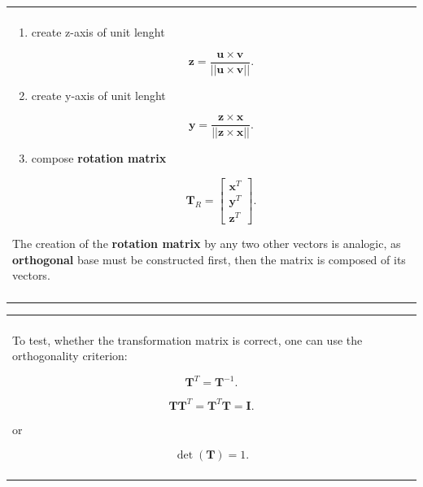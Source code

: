 \documentclass[10pt,b5paper,titlepage]{book}
\newenvironment{bbox}[1][0.96]
{
    \begin{center}
        \begin{tabular}{|p{#1\textwidth}|}
            \hline\\
}
{
            \\\\\hline
        \end{tabular}
    \end{center}
}
\begin{document}
\begin{enumerate}
\begin{bbox}
\begin{enumerate}
                \item create z-axis of unit lenght

                    \begin{equation}
                        \mathbf{z}
                        = \frac{\mathbf{u} \times \mathbf{v}}{||\mathbf{u} \times \mathbf{v}||}
                    .\end{equation}

                \item create y-axis of unit lenght

                    \begin{equation}
                        \mathbf{y}
                        = \frac{\mathbf{z} \times \mathbf{x}}{||\mathbf{z} \times \mathbf{x}||}
                    .\end{equation}

                \item compose \textbf{rotation matrix}

                    \begin{equation}
                        \mathbf{T}_{R} = \begin{bmatrix}
                            \mathbf{x}^{T} \\
                            \mathbf{y}^{T} \\
                            \mathbf{z}^{T}
                        \end{bmatrix}
                    .\end{equation}
            \end{enumerate}

            The creation of the \textbf{rotation matrix} by any two other vectors is
            analogic, as \textbf{orthogonal} base must be constructed first, then
            the matrix is composed of its vectors.
        \end{bbox}

        \begin{bbox}
            To test, whether the transformation matrix is correct, one can use
            the orthogonality criterion:

            \begin{equation}
                \mathbf{T}^{T} = \mathbf{T}^{-1}
            .\end{equation}

            \begin{equation}
                \mathbf{T}\mathbf{T}^{T} = \mathbf{T}^{T}\mathbf{T} = \mathbf{I}
            .\end{equation}

            or

            \begin{equation}
                \det(\mathbf{T}) = 1
            .\end{equation}
        \end{bbox}

\end{enumerate}
\end{document}
